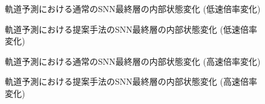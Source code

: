 \begin{figure}[htbp] %
    \centering
    
    \label{fig:discussion3:snn:a3}
    \caption{
        軌道予測における通常のSNN最終層の内部状態変化 (低速倍率変化)
    }
\end{figure}

\begin{figure}[htbp] %
    \centering
    
    \label{fig:discussion3:dyna:a3}
    \caption{
        軌道予測における提案手法のSNN最終層の内部状態変化 (低速倍率変化)
    }
\end{figure}


\begin{figure}[htbp] %
    \centering
    
    \label{fig:discussion3:snn:a05}
    \caption{
        軌道予測における通常のSNN最終層の内部状態変化 (高速倍率変化)
    }
\end{figure}

\begin{figure}[htbp] %
    \centering
    
    \label{fig:discussion3:dyna:a05}
    \caption{
        軌道予測における提案手法のSNN最終層の内部状態変化 (高速倍率変化)
    }
\end{figure}
